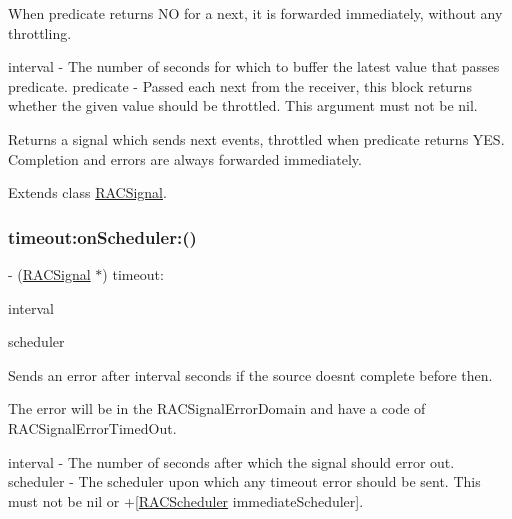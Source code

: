 When {\ttfamily predicate} returns NO for a {\ttfamily next}, it is forwarded immediately, without any throttling.

interval -\/ The number of seconds for which to buffer the latest value that passes {\ttfamily predicate}. predicate -\/ Passed each {\ttfamily next} from the receiver, this block returns whether the given value should be throttled. This argument must not be nil.

Returns a signal which sends {\ttfamily next} events, throttled when {\ttfamily predicate} returns Y\+ES. Completion and errors are always forwarded immediately. 

Extends class \mbox{\hyperlink{interface_r_a_c_signal_a0310fbee83b4ca1b1daca25daf24f41b}{R\+A\+C\+Signal}}.

\mbox{\label{category_r_a_c_signal_07_operations_08_a8c5f03f4cc8a132e91a985f3d5ccebc0}} 
\subsubsection{\texorpdfstring{timeout\+:on\+Scheduler\+:()}{timeout:onScheduler:()}\hspace{0.1cm}{\footnotesize\ttfamily [1/3]}}
{\footnotesize\ttfamily -\/ (\mbox{\hyperlink{interface_r_a_c_signal}{R\+A\+C\+Signal}} $\ast$) timeout\+: \begin{DoxyParamCaption}\item[{(N\+S\+Time\+Interval)}]{interval }\item[{onScheduler:(\mbox{\hyperlink{interface_r_a_c_scheduler}{R\+A\+C\+Scheduler}} $\ast$)}]{scheduler }\end{DoxyParamCaption}}

Sends an error after {\ttfamily interval} seconds if the source doesn\textquotesingle{}t complete before then.

The error will be in the R\+A\+C\+Signal\+Error\+Domain and have a code of R\+A\+C\+Signal\+Error\+Timed\+Out.

interval -\/ The number of seconds after which the signal should error out. scheduler -\/ The scheduler upon which any timeout error should be sent. This must not be nil or +\mbox{[}\mbox{\hyperlink{interface_r_a_c_scheduler}{R\+A\+C\+Scheduler}} immediate\+Scheduler\mbox{]}.


